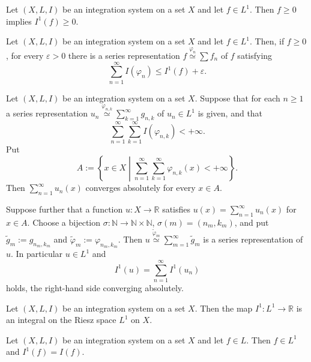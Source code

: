 \begin{lemma}\label{lem:ext-int-is-positive}
  Let $(X,L,I)$ be an integration system on a set $X$ and let
  $f\in L^1$.
  Then $f\ge0$ implies $I^1(f)\ge0$.
\end{lemma}

\begin{lemma}\label{lem:positive-good-representation}
  Let $(X,L,I)$ be an integration system on a set $X$ and let
  $f\in L^1$.
  Then, if $f\ge0$, for every $\varepsilon>0$ there is a series representation
  $f\overset{\varphi_n}{\simeq}\sum f_n$ of $f$ satisfying
  \[
    \sum_{n=1}^\infty I(\varphi_n)\le I^1(f)+\varepsilon .
  \]
\end{lemma}

\begin{lemma}\label{lem:flatten-series-representations}
  Let $(X,L,I)$ be an integration system on a set $X$.
  Suppose that for each $n\ge1$ a series representation
  $u_n\overset{\varphi_{n,k}}{\simeq}\sum_{k=1}^\infty g_{n,k}$ of $u_n\in L^1$
  is given, and that
  \[
    \sum_{n=1}^\infty\sum_{k=1}^\infty I(\varphi_{n,k})<+\infty .
  \]
  Put
  \[
    A:=\left\{x\in X\mathrel{}\middle|\mathrel{}\sum_{n=1}^\infty\sum_{k=1}^\infty\varphi_{n,k}(x)<+\infty\right\} .
  \]
  Then $\sum_{n=1}^\infty u_n(x)$ converges absolutely for every $x\in A$.

  Suppose further that a function $u:X\to\mathbb{R}$ satisfies
  $u(x)=\sum_{n=1}^\infty u_n(x)$ for $x\in A$.
  Choose a bijection $\sigma:\mathbb{N}\to\mathbb{N}\times\mathbb{N}$,
  $\sigma(m)=(n_m,k_m)$, and put $\widetilde{g}_m:=g_{n_m,k_m}$ and
  $\widetilde{\varphi}_m:=\varphi_{n_m,k_m}$.
  Then $u\overset{\widetilde{\varphi}_m}{\simeq}\sum_{m=1}^\infty\widetilde{g}_m$
  is a series representation of $u$.
  In particular $u\in L^1$ and
  \[
    I^1(u)=\sum_{n=1}^\infty I^1(u_n)
  \]
  holds, the right-hand side converging absolutely.
\end{lemma}

\begin{theorem}\label{thm:ext-int-is-integral}
  Let $(X,L,I)$ be an integration system on a set $X$.
  Then the map $I^1:L^1\to\mathbb{R}$ is an integral on the Riesz space $L^1$ on
  $X$.
\end{theorem}

\begin{lemma}\label{lem:daniell-ext-contains-source}
  Let $(X,L,I)$ be an integration system on a set $X$ and let $f\in L$.
  Then $f\in L^1$ and $I^1(f)=I(f)$.
\end{lemma}

